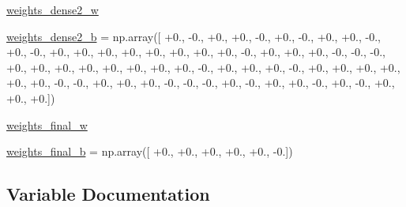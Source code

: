 \begin{DoxyCompactItemize}
\item 
\hyperlink{namespacepybullet-gym_1_1pybulletgym_1_1tests_1_1roboschool_1_1agents_1_1_walker2_d_py_bullet_env__v0__2017may_ab57f80c68195d74dcaaaf1bd8bd427d7}{weights\+\_\+dense2\+\_\+w}
\item 
\hyperlink{namespacepybullet-gym_1_1pybulletgym_1_1tests_1_1roboschool_1_1agents_1_1_walker2_d_py_bullet_env__v0__2017may_aece079e85cace00ac8a2e170ee1f3c0b}{weights\+\_\+dense2\+\_\+b} = np.\+array(\mbox{[} +0., -\/0., +0., +0., -\/0., +0., -\/0., +0., +0., -\/0., +0., -\/0., +0., +0., +0., +0., +0., +0., +0., +0., -\/0., +0., +0., +0., -\/0., -\/0., -\/0., +0., +0., +0., +0., +0., +0., +0., +0., -\/0., +0., +0., +0., -\/0., +0., +0., +0., +0., +0., +0., -\/0., -\/0., +0., +0., +0., -\/0., -\/0., -\/0., +0., -\/0., +0., +0., -\/0., +0., -\/0., +0., +0., +0.\mbox{]})
\item 
\hyperlink{namespacepybullet-gym_1_1pybulletgym_1_1tests_1_1roboschool_1_1agents_1_1_walker2_d_py_bullet_env__v0__2017may_a93d1b7d1ecec1a910a4387444f0a6d6a}{weights\+\_\+final\+\_\+w}
\item 
\hyperlink{namespacepybullet-gym_1_1pybulletgym_1_1tests_1_1roboschool_1_1agents_1_1_walker2_d_py_bullet_env__v0__2017may_ad534d77d691237bf90d4889612e40e74}{weights\+\_\+final\+\_\+b} = np.\+array(\mbox{[} +0., +0., +0., +0., +0., -\/0.\mbox{]})
\end{DoxyCompactItemize}


\subsection{Variable Documentation}
